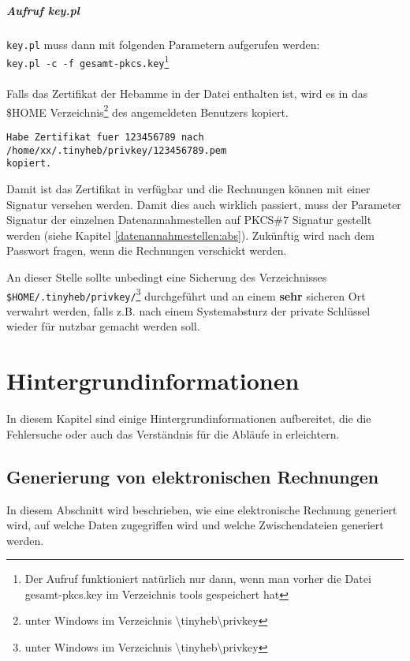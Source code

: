 \paragraph{Aufruf key.pl}
\verb|key.pl| muss dann mit folgenden Parametern aufgerufen werden:
\\
\verb|key.pl -c -f gesamt-pkcs.key|\footnote{Der Aufruf funktioniert
natürlich nur dann, wenn man vorher die Datei gesamt-pkcs.key im
Verzeichnis tools gespeichert hat}\\
\\
Falls das Zertifikat der Hebamme in der Datei enthalten ist, wird es
in das \$HOME Verzeichnis\footnote{unter Windows im Verzeichnis \textbackslash tinyheb\textbackslash privkey} des angemeldeten Benutzers kopiert.
\begin{verbatim}
Habe Zertifikat fuer 123456789 nach /home/xx/.tinyheb/privkey/123456789.pem 
kopiert.
\end{verbatim}

Damit ist das Zertifikat in \tinyHeb\/ verfügbar und die Rechnungen können
mit einer Signatur versehen werden. Damit dies auch wirklich passiert,
muss der Parameter Signatur der einzelnen Datenannahmestellen auf 
PKCS\#7 Signatur gestellt werden 
(siehe Kapitel \vref{datenannahmestellen:abs}). 
Zukünftig wird \tinyHeb\/ nach dem
Passwort fragen, wenn die Rechnungen verschickt werden.

An dieser Stelle sollte unbedingt eine Sicherung des Verzeichnisses 
\verb|$HOME/.tinyheb/privkey/|\footnote{unter Windows im Verzeichnis \textbackslash tinyheb\textbackslash privkey}
durchgeführt und an einem \textbf{sehr} sicheren Ort
verwahrt werden, falls z.B. nach einem Systemabsturz der private
Schlüssel wieder für \tinyHeb\/ nutzbar gemacht werden soll.
\marginline{\Huge\bfseries!}%



\chapter{Hintergrundinformationen}

In diesem Kapitel sind einige Hintergrundinformationen aufbereitet, die
die Fehlersuche oder auch das Verständnis für die Abläufe in \tinyHeb\/
erleichtern.

\section{Generierung von elektronischen Rechnungen}

In diesem Abschnitt wird beschrieben, wie eine elektronische Rechnung
generiert wird, auf welche Daten zugegriffen wird und welche
Zwischendateien generiert werden.

